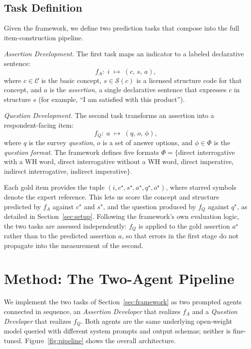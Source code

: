 \documentclass[onecolumn, 11pt]{IEEEtran}
\begin{document}
\subsection{Task Definition}
Given the framework, we define two prediction tasks that compose into the full item-construction pipeline.

\emph{Assertion Development.} The first task maps an indicator to a labeled declarative sentence:
\begin{equation}
f_A:\; i \;\longmapsto\; (c,\, s,\, a),
\end{equation}
where $c \in \mathcal{C}$ is the basic concept, $s \in \mathcal{S}(c)$ is a licensed structure code for that concept, and $a$ is the \emph{assertion}, a single declarative sentence that expresses $c$ in structure $s$ (for example, ``I am satisfied with this product'').

\emph{Question Development.} The second task transforms an assertion into a respondent-facing item:
\begin{equation}
f_Q:\; a \;\longmapsto\; (q,\, o,\, \phi),
\end{equation}
where $q$ is the survey \emph{question}, $o$ is a set of answer options, and $\phi \in \Phi$ is the \emph{question format}. The framework defines five formats $\Phi = \{$direct interrogative with a WH word, direct interrogative without a WH word, direct imperative, indirect interrogative, indirect imperative$\}$.

Each gold item provides the tuple $(i, c^\star, s^\star, a^\star, q^\star, o^\star)$, where starred symbols denote the expert reference. This lets us score the concept and structure predicted by $f_A$ against $c^\star$ and $s^\star$, and the question produced by $f_Q$ against $q^\star$, as detailed in Section~\ref{sec:setup}. Following the framework's own evaluation logic, the two tasks are assessed independently: $f_Q$ is applied to the gold assertion $a^\star$ rather than to the predicted assertion $a$, so that errors in the first stage do not propagate into the measurement of the second.

\section{Method: The Two-Agent Pipeline}
\label{sec:method}

We implement the two tasks of Section~\ref{sec:framework} as two prompted agents connected in sequence, an \emph{Assertion Developer} that realizes $f_A$ and a \emph{Question Developer} that realizes $f_Q$. Both agents are the same underlying open-weight model queried with different system prompts and output schemas; neither is fine-tuned. Figure~\ref{fig:pipeline} shows the overall architecture.
\end{document}
